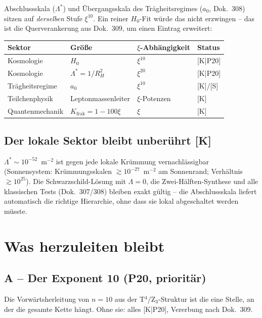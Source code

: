 \documentclass[11pt]{report}
\begin{document}
Abschlussskala ($\Lambda^{*}$) und Übergangsskala des
Trägheitsregimes ($a_0$, Dok.~308) sitzen auf \emph{derselben} Stufe
$\xi^{10}$. Ein reiner $H_0$-Fit würde das nicht erzwingen -- das ist
die Querverankerung aus Dok.~309, um einen Eintrag erweitert:

\begin{center}
\begin{tabular}{llll}
\toprule
Sektor & Größe & $\xi$-Abhängigkeit & Status \\
\midrule
Kosmologie & $H_0$ & $\xi^{10}$ & [K|P20] \\
Kosmologie & $\Lambda^{*} = 1/R_H^2$ & $\xi^{20}$ & [K|P20] \\
Trägheitsregime & $a_0$ & $\xi^{10}$ & [K]/[S] \\
Teilchenphysik & Leptonmassenleiter & $\xi$-Potenzen & [K] \\
Quantenmechanik & $K_\text{frak} = 1-100\xi$ & $\xi$ & [K] \\
\bottomrule
\end{tabular}
\end{center}

\section{Der lokale Sektor bleibt unberührt [K]}

$\Lambda^{*} \sim 10^{-52}$~m$^{-2}$ ist gegen jede lokale Krümmung
vernachlässigbar (Sonnensystem: Krümmungsskalen
$\gtrsim 10^{-27}$~m$^{-2}$ am Sonnenrand; Verhältnis
$\gtrsim 10^{25}$). Die Schwarzschild-Lösung mit $\Lambda = 0$, die
Zwei-Hälften-Synthese und alle klassischen Tests (Dok.~307/308)
bleiben exakt gültig -- die Abschlussskala liefert automatisch die
richtige Hierarchie, ohne dass sie lokal abgeschaltet werden müsste.

\chapter{Was herzuleiten bleibt}

\section{A -- Der Exponent 10 (P20, prioritär)}

Die Vorwärtsherleitung von $n=10$ aus der T$^4$/Z$_3$-Struktur ist
die eine Stelle, an der die gesamte Kette hängt. Ohne sie: alles
[K|P20], Vererbung nach Dok.~309.
\end{document}
